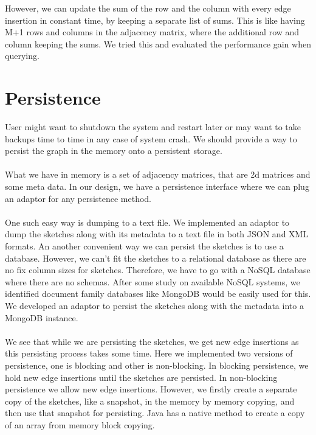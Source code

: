 \documentclass[12pt]{report}
\numberwithin{figure}{section}
\numberwithin{table}{section}
\begin{document}
However, we can update the sum of the row and the column with every edge insertion in constant time, by keeping a separate list of sums. This is like having M+1 rows and columns in the adjacency matrix, where the additional row and column keeping the sums. We tried this and evaluated the performance gain when querying. 

\section{Persistence}
User might want to shutdown the system and restart later or may want to take backups time to time in any case of system crash. We should provide a way to persist the graph in the memory onto a persistent storage. 

\paragraph{}

What we have in memory is a set of adjacency matrices, that are 2d matrices and some meta data.  In our design, we have a persistence interface where we can plug an adaptor for any persistence method. 

\paragraph{}

One such easy way is dumping to a text file.  We implemented an adaptor to dump the sketches along with its metadata to a text file in both JSON and XML formats. An another convenient way we can persist the sketches is to use a database. However, we can’t fit the sketches to a relational database as there are no fix column sizes for sketches. Therefore, we have to go with a NoSQL database where there are no schemas. After some study on available NoSQL systems, we identified document family databases like MongoDB would be easily used for this. We developed an adaptor to persist the sketches along with the metadata into a MongoDB instance.

\paragraph{}

We see that while we are persisting the sketches, we get new edge insertions as this persisting process takes some time. Here we implemented two versions of persistence, one is blocking and other is non-blocking. In blocking persistence, we hold new edge insertions until the sketches are persisted. In non-blocking persistence we allow new edge insertions. However, we firstly create a separate copy of the sketches, like a snapshot,  in the memory by memory copying, and then use that snapshot for persisting. Java has a native method to create a copy of an array from memory block copying. 
\end{document}
